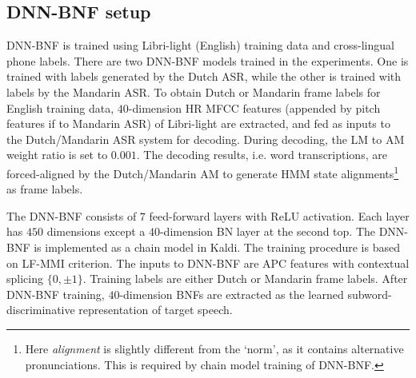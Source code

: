 \documentclass[a4paper]{article}
\begin{document}

\subsection{DNN-BNF setup}
DNN-BNF is trained using Libri-light (English) training data and cross-lingual phone labels. 
There are two DNN-BNF models trained in the experiments. One is trained with labels generated by the Dutch ASR, while the other is trained with labels by the Mandarin ASR. To obtain Dutch or Mandarin frame labels for English training data, $40$-dimension HR MFCC features (appended by pitch features if to Mandarin ASR) of Libri-light are extracted, and fed as inputs to the Dutch/Mandarin ASR system for decoding. 
During decoding, the LM to AM weight ratio is set to $0.001$.
The decoding results, i.e. word transcriptions,  are  forced-aligned by the Dutch/Mandarin AM to generate HMM state alignments\footnote{Here \textit{alignment} is slightly different from the `norm', as it contains alternative pronunciations. This is required by chain model training of DNN-BNF.} as frame labels.

The DNN-BNF consists of $7$ feed-forward layers with ReLU activation. Each layer has $450$ dimensions except a $40$-dimension BN layer at the second top. The DNN-BNF is implemented  as a chain model in Kaldi. The training procedure  is based on  LF-MMI criterion. 
The inputs to DNN-BNF are APC  features with contextual splicing $\{0,\pm 1\}$.
Training labels are either Dutch  or Mandarin frame labels. After DNN-BNF training, $40$-dimension BNFs are extracted as the learned subword-discriminative representation of target speech. 

\end{document}
